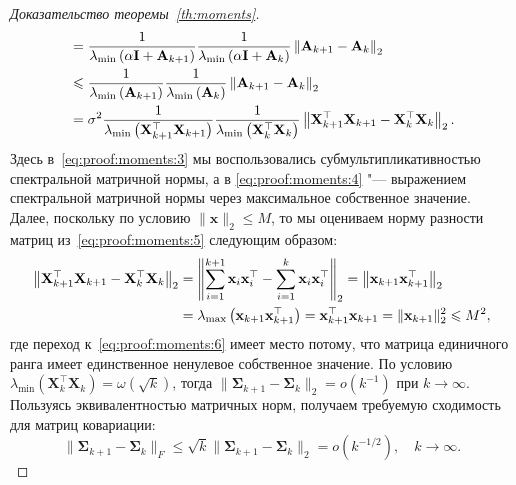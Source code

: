 \begin{proof}[Доказательство теоремы~\ref{th:moments}]
\begin{align}
        &= \frac{1}{\lambda_{\min}\left( \alpha \mathbf{I} + \mathbf{A}_{k+1} \right)} \frac{1}{\lambda_{\min}\left( \alpha \mathbf{I} + \mathbf{A}_k \right)} \left\| \mathbf{A}_{k+1} - \mathbf{A}_k \right\|_2 \label{eq:proof:moments:4} \\
        &\leqslant \frac{1}{\lambda_{\min}\left( \mathbf{A}_{k+1} \right)} \frac{1}{\lambda_{\min}\left( \mathbf{A}_k \right)} \left\| \mathbf{A}_{k+1} - \mathbf{A}_k \right\|_2 \notag \\
        &= \sigma^2  \frac{1}{\lambda_{\min}\left( \mathbf{X}^\top_{k+1} \mathbf{X}_{k+1} \right)} \frac{1}{\lambda_{\min}\left( \mathbf{X}^\top_k \mathbf{X}_k \right)} \left\| \mathbf{X}^\top_{k+1} \mathbf{X}_{k+1} - \mathbf{X}^\top_k \mathbf{X}_k \right\|_2. \label{eq:proof:moments:5}
    \end{align}
    Здесь в~\eqref{eq:proof:moments:3} мы воспользовались субмультипликативностью спектральной матричной нормы, а в \eqref{eq:proof:moments:4} "--- выражением спектральной матричной нормы через максимальное собственное значение.
    Далее, поскольку по условию $\| \mathbf{x} \|_2 \leqslant M$, то мы оцениваем норму разности матриц из~\eqref{eq:proof:moments:5} следующим образом:
    \begin{align}
        \left\| \mathbf{X}^\top_{k+1} \mathbf{X}_{k+1} - \mathbf{X}^\top_k \mathbf{X}_k \right\|_2 
        &= \left\| \sum\limits_{i=1}^{k+1} \mathbf{x}_i \mathbf{x}_i^\top - \sum\limits_{i=1}^{k} \mathbf{x}_i \mathbf{x}_i^\top \right\|_2 = \left\| \mathbf{x}_{k+1} \mathbf{x}_{k+1}^\top \right\|_2 \notag \\
        &= \lambda_{\max}\left( \mathbf{x}_{k+1} \mathbf{x}_{k+1}^\top \right)  = \mathbf{x}_{k+1}^\top \mathbf{x}_{k+1} = \| \mathbf{x}_{k+1} \|_2^2 \leqslant M^2, \label{eq:proof:moments:6}
    \end{align}
    где переход к~\eqref{eq:proof:moments:6} имеет место потому, что матрица единичного ранга имеет единственное ненулевое собственное значение. По условию $\lambda_{\min}\left( \mathbf{X}^\top_k \mathbf{X}_k \right) = \omega(\sqrt{k})$, тогда $\| \boldsymbol{\Sigma}_{k+1} - \boldsymbol{\Sigma}_k \|_2 = o(k^{-1})$ при $k \to \infty$. Пользуясь эквивалентностью матричных норм, получаем требуемую сходимость для матриц ковариации:
    \begin{equation}
        \| \boldsymbol{\Sigma}_{k+1} - \boldsymbol{\Sigma}_k \|_F \leqslant \sqrt{k} \| \boldsymbol{\Sigma}_{k+1} - \boldsymbol{\Sigma}_k \|_2 = o(k^{-1/2}), \quad k \to \infty.
    \end{equation}

\end{proof}

